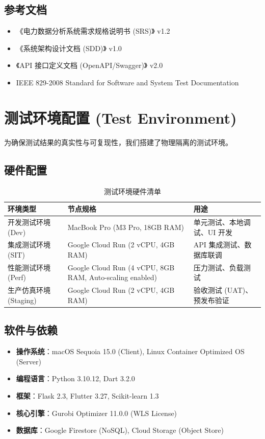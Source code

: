 \subsection{参考文档}
\begin{itemize}
    \item 《电力数据分析系统需求规格说明书 (SRS)》 v1.2
    \item 《系统架构设计文档 (SDD)》 v1.0
    \item 《API 接口定义文档 (OpenAPI/Swagger)》 v2.0
    \item IEEE 829-2008 Standard for Software and System Test Documentation
\end{itemize}

\section{测试环境配置 (Test Environment)}

为确保测试结果的真实性与可复现性，我们搭建了物理隔离的测试环境。

\subsection{硬件配置}
\begin{table}[h]
    \centering
    \caption{测试环境硬件清单}
    \begin{tabular}{|p{3cm}|p{5cm}|p{5cm}|}
        \hline
        \textbf{环境类型}    & \textbf{节点规格}                                            & \textbf{用途}      \\ \hline
        开发测试环境 (Dev)     & MacBook Pro (M3 Pro, 18GB RAM)                           & 单元测试、本地调试、UI 开发  \\ \hline
        集成测试环境 (SIT)     & Google Cloud Run (2 vCPU, 4GB RAM)                       & API 集成测试、数据库联调   \\ \hline
        性能测试环境 (Perf)    & Google Cloud Run (4 vCPU, 8GB RAM, Auto-scaling enabled) & 压力测试、负载测试        \\ \hline
        生产仿真环境 (Staging) & Google Cloud Run (2 vCPU, 4GB RAM)                       & 验收测试 (UAT)、预发布验证 \\ \hline
    \end{tabular}
\end{table}

\subsection{软件与依赖}
\begin{itemize}
    \item \textbf{操作系统}：macOS Sequoia 15.0 (Client), Linux Container Optimized OS (Server)
    \item \textbf{编程语言}：Python 3.10.12, Dart 3.2.0
    \item \textbf{框架}：Flask 2.3, Flutter 3.27, Scikit-learn 1.3
    \item \textbf{核心引擎}：Gurobi Optimizer 11.0.0 (WLS License)
    \item \textbf{数据库}：Google Firestore (NoSQL), Cloud Storage (Object Store)
\end{itemize}

